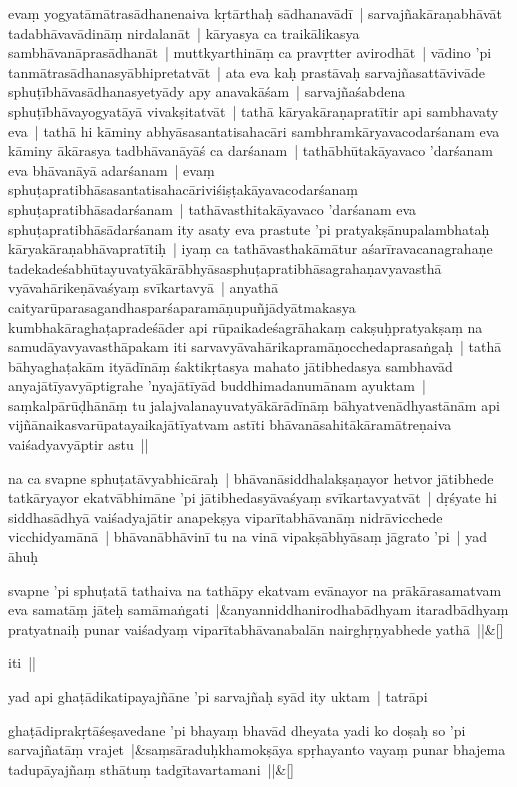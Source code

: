\documentclass[article,12pt,a4paper]{memoir}
\begin{document}
	  \pstart evaṃ yogyatāmātrasādhanenaiva kṛtārthaḥ sādhanavādī | sarvajñakāraṇabhāvāt tadabhāvavādināṃ nirdalanāt | kāryasya ca traikālikasya sambhāvanāprasādhanāt | muttkyarthināṃ ca pravṛtter avirodhāt | vādino 'pi tanmātrasādhanasyābhipretatvāt | ata eva kaḥ prastāvaḥ sarvajñasattāvivāde sphuṭībhāvasādhanasyetyādy apy anavakāśam | sarvajñaśabdena sphuṭībhāvayogyatāyā vivakṣitatvāt | tathā kāryakāraṇapratītir api sambhavaty eva | tathā hi kāminy abhyāsasantatisahacāri sambhramkāryavacodarśanam eva kāminy ākārasya tadbhāvanāyāś ca darśanam | tathābhūtakāyavaco 'darśanam eva bhāvanāyā adarśanam | evaṃ sphuṭapratibhāsasantatisahacāriviśiṣṭakāyavacodarśanaṃ sphuṭapratibhāsadarśanam | tathāvasthitakāyavaco 'darśanam eva sphuṭapratibhāsādarśanam ity asaty eva prastute 'pi pratyakṣānupalambhataḥ kāryakāraṇabhāvapratītiḥ | iyaṃ ca tathāvasthakāmātur aśarīravacanagrahaṇe tadekadeśabhūtayuvatyākārābhyāsasphuṭapratibhāsagrahaṇavyavasthā vyāvahārikeṇāvaśyaṃ svīkartavyā | anyathā caityarūparasagandhasparśaparamāṇupuñjādyātmakasya kumbhakāraghaṭapradeśāder api rūpaikadeśagrāhakaṃ cakṣuḥpratyakṣaṃ na samudāyavyavasthāpakam iti sarvavyāvahārikapramāṇocchedaprasaṅgaḥ | tathā bāhyaghaṭakām ityādīnāṃ śaktikṛtasya mahato jātibhedasya sambhavād anyajātīyavyāptigrahe 'nyajātīyād buddhimadanumānam ayuktam | saṃkalpārūḍhānāṃ tu jalajvalanayuvatyākārādīnāṃ bāhyatvenādhyastānām api vijñānaikasvarūpatayaikajātīyatvam astīti bhāvanāsahitākāramātreṇaiva vaiśadyavyāptir astu ||
	\pend
      

	  \pstart na ca svapne sphuṭatāvyabhicāraḥ | bhāvanāsiddhalakṣaṇayor hetvor jātibhede tatkāryayor ekatvābhimāne 'pi jātibhedasyāvaśyaṃ svīkartavyatvāt | dṛśyate hi siddhasādhyā vaiśadyajātir anapekṣya viparītabhāvanāṃ nidrāvicchede vicchidyamānā | bhāvanābhāvinī tu na vinā vipakṣābhyāsaṃ jāgrato 'pi | yad āhuḥ 
	\pend
      
	    
	    \stanza[\smallbreak]
	svapne 'pi sphuṭatā tathaiva na tathāpy ekatvam evānayor na prākārasamatvam eva samatāṃ jāteḥ samāmaṅgati |&anyanniddhanirodhabādhyam itaradbādhyaṃ pratyatnaiḥ punar vaiśadyaṃ viparītabhāvanabalān nairghṛṇyabhede yathā ||\&[\smallbreak]


	

	  \pstart iti ||
	\pend
      

	  \pstart yad api ghaṭādikatipayajñāne 'pi sarvajñaḥ syād ity uktam | tatrāpi 
	\pend
      
	    
	    \stanza[\smallbreak]
	ghaṭādiprakṛtāśeṣavedane 'pi bhayaṃ bhavād dheyata yadi ko doṣaḥ so 'pi sarvajñatāṃ vrajet |&saṃsāraduḥkhamokṣāya spṛhayanto vayaṃ punar bhajema tadupāyajñaṃ sthātuṃ tadgītavartamani ||\&[\smallbreak]
\end{document}
